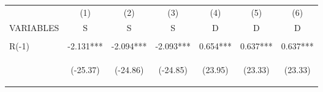 \documentclass[]{article}
\begin{document}
\begin{center}
    \begin{tabular}{lcccccc} \hline
                         & (1)                                            & (2)                                            & (3)                                            & (4)                                            & (5)                                            & (6)                                            \\
        VARIABLES        & S                                              & S                                              & S                                              & D                                              & D                                              & D                                              \\ \hline
        \vspace{4pt}     & \begin{footnotesize}\end{footnotesize}         & \begin{footnotesize}\end{footnotesize}         & \begin{footnotesize}\end{footnotesize}         & \begin{footnotesize}\end{footnotesize}         & \begin{footnotesize}\end{footnotesize}         & \begin{footnotesize}\end{footnotesize}         \\
        R(-1)            & -2.131***                                      & -2.094***                                      & -2.093***                                      & 0.654***                                       & 0.637***                                       & 0.637***                                       \\
        \vspace{4pt}     & \begin{footnotesize}(-25.37)\end{footnotesize} & \begin{footnotesize}(-24.86)\end{footnotesize} & \begin{footnotesize}(-24.85)\end{footnotesize} & \begin{footnotesize}(23.95)\end{footnotesize}  & \begin{footnotesize}(23.33)\end{footnotesize}  & \begin{footnotesize}(23.33)\end{footnotesize}  \\

\end{tabular}
\end{center}
\end{document}
